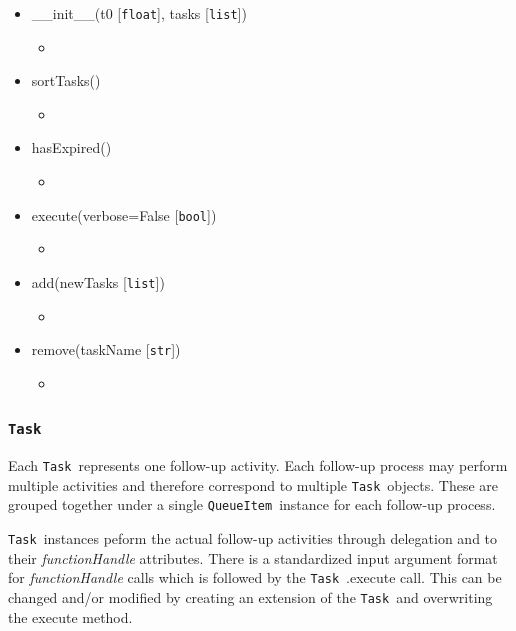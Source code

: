\documentclass{article}
\newcommand{\QueueItem}{\texttt{QueueItem}~}
\newcommand{\Task}{\texttt{Task}~}
\begin{document}
\begin{itemize}
    \item{\_\_init\_\_(t0 [\texttt{float}], tasks [\texttt{list}])
        \begin{itemize}
            \item{}
        \end{itemize}
         }
    \item{sortTasks()
        \begin{itemize}
            \item{}
        \end{itemize}
         }
    \item{hasExpired()
        \begin{itemize}
            \item{}
        \end{itemize}
         }
    \item{execute(verbose=False [\texttt{bool}])
        \begin{itemize}
            \item{}
        \end{itemize}
         }
    \item{add(newTasks [\texttt{list}])
        \begin{itemize}
            \item{}
        \end{itemize}
         }
    \item{remove(taskName [\texttt{str}])
        \begin{itemize}
            \item{}
        \end{itemize}
         }
\end{itemize}


\subsubsection{\Task}
\label{sec: Task}

Each \Task represents one follow-up activity.
Each follow-up process may perform multiple activities and therefore correspond to multiple \Task objects.
These are grouped together under a single \QueueItem instance for each follow-up process.

\Task instances peform the actual follow-up activities through delegation and to their \textit{functionHandle} attributes.
There is a standardized input argument format for \textit{functionHandle} calls which is followed by the \Task.execute call.
This can be changed and/or modified by creating an extension of the \Task and overwriting the execute method.
\end{document}
